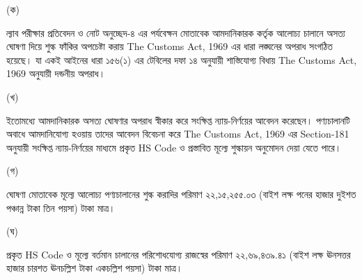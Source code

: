 \documentclass[12pt]{article}
\begin{document}
\begin{minipage}[t]{0.05\linewidth}
(ক)
\end{minipage}
\begin{minipage}[t]{0.90\linewidth}
ল্যাব পরীক্ষার প্রতিবেদন ও নোট অনুচ্ছেদ-৪ এর
পর্যবেক্ষন মোতাবেক আমদানিকারক কর্তৃক আলোচ্য
চালানে অসত্য ঘোষণা দিয়ে শুল্ক ফাঁকির অপচেষ্টা করায়
The Customs Act, 1969
এর ধারা লঙ্ঘনের অপরাধ সংগঠিত হয়েছে।
যা একই আইনের ধারা ১৫৬(১) এর টেবিলের দফা
১৪ অনুযায়ী শাস্তিযোগ্য বিধায়
The Customs Act, 1969
অনুযায়ী দন্ডনীয় অপরাধ।
\end{minipage}
\begin{minipage}[t]{0.05\linewidth}
\hspace{1em}
\end{minipage}
\begin{minipage}[t]{0.05\linewidth}
(খ)
\end{minipage}
\begin{minipage}[t]{0.90\linewidth}
ইতোমধ্যে আমদানিকারক অসত্য ঘোষণার অপরাধ
স্বীকার করে সংক্ষিপ্ত ন্যায়-নির্ণয়ের আবেদন করেছেন।
পণ্যচালানটি অবাধে আমদানিযোগ্য হওয়ায় তাদের আবেদন
বিবেচনা করে
The Customs Act, 1969
এর Section-181
অনুযায়ী সংক্ষিপ্ত ন্যায়-নির্ণয়ের মাধ্যমে
প্রকৃত HS Code ও প্রস্তাবিত মূল্যে
শুল্কায়ন অনুমোদন দেয়া যেতে পারে।
\end{minipage}
\begin{minipage}[t]{0.05\linewidth}
\hspace{1em}
\end{minipage}
\begin{minipage}[t]{0.05\linewidth}
(গ)
\end{minipage}
\begin{minipage}[t]{0.90\linewidth}
ঘোষণা মোতাবেক মূল্যে আলোচ্য পণ্যচালানের শুল্ক করাদির
পরিমাণ ২২,১৫,২৫৫.০৩
(বাইশ লক্ষ পনের হাজার দুইশত পঞ্চান্ন টাকা তিন পয়সা) টাকা মাত্র।
\end{minipage}
\begin{minipage}[t]{0.05\linewidth}
\hspace{1em}
\end{minipage}
\begin{minipage}[t]{0.05\linewidth}
(ঘ)
\end{minipage}
\begin{minipage}[t]{0.90\linewidth}
প্রকৃত HS Code ও মূল্যে বর্তমান চালানের পরিশোধযোগ্য
রাজস্বের পরিমাণ ২২,৬৯,৪৩৯.৪১
(বাইশ লক্ষ ঊনসত্তর হাজার চারশত ঊনচল্লিশ টাকা একচল্লিশ পয়সা) টাকা মাত্র।
\end{minipage}
\begin{minipage}[t]{0.05\linewidth}
\hspace{1em}
\end{minipage}
\end{document}
